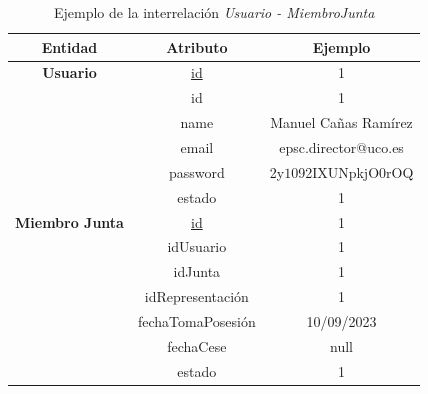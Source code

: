 \begin{itemize}
    \begin{table}[H]
    \centering
        \begin{tabular}{ | c | c | c |  }
             \hline
                 \textbf{Entidad} & \textbf{Atributo} & \textbf{Ejemplo}\\       
             \hline
                 \textbf{Usuario}  & \underline{id} & 1\\
                  & id & 1\\
                  & name & Manuel Cañas Ramírez\\
                  & email & epsc.director@uco.es\\
                  & password & 2y$10$92IXUNpkjO0rOQ\\
                  & estado & 1\\
              \hline
                  \textbf{Miembro Junta}  & \underline{id} & 1\\
                  & idUsuario & 1\\
                  & idJunta & 1\\
                  & idRepresentación & 1\\
                  & fechaTomaPosesión & 10/09/2023\\
                  & fechaCese & null\\
                  & estado & 1\\
        \end{tabular}
        \caption{Ejemplo de la interrelación \textit{Usuario - MiembroJunta}}
        \label{table:I-Usu-MiJu}
    \end{table}
\end{itemize}

